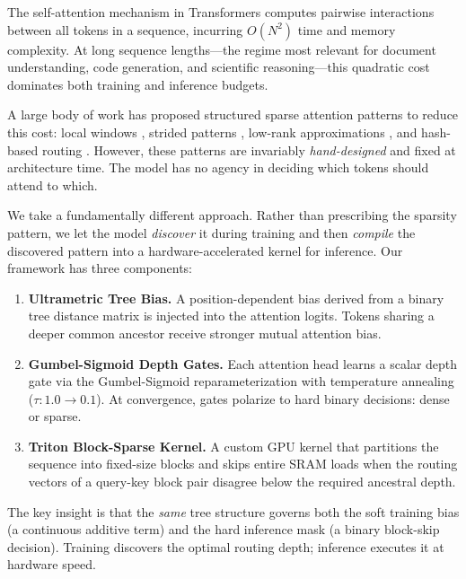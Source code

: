 \documentclass[11pt,a4paper]{article}
\begin{document}
The self-attention mechanism in Transformers computes pairwise interactions between all tokens in a sequence, incurring $O(N^2)$ time and memory complexity. At long sequence lengths---the regime most relevant for document understanding, code generation, and scientific reasoning---this quadratic cost dominates both training and inference budgets.

A large body of work has proposed structured sparse attention patterns to reduce this cost: local windows \citep{beltagy2020longformer}, strided patterns \citep{child2019sparse}, low-rank approximations \citep{wang2020linformer}, and hash-based routing \citep{kitaev2020reformer}. However, these patterns are invariably \emph{hand-designed} and fixed at architecture time. The model has no agency in deciding which tokens should attend to which.

We take a fundamentally different approach. Rather than prescribing the sparsity pattern, we let the model \emph{discover} it during training and then \emph{compile} the discovered pattern into a hardware-accelerated kernel for inference. Our framework has three components:

\begin{enumerate}
    \item \textbf{Ultrametric Tree Bias.} A position-dependent bias derived from a binary tree distance matrix is injected into the attention logits. Tokens sharing a deeper common ancestor receive stronger mutual attention bias.
    \item \textbf{Gumbel-Sigmoid Depth Gates.} Each attention head learns a scalar depth gate via the Gumbel-Sigmoid reparameterization with temperature annealing ($\tau: 1.0 \to 0.1$). At convergence, gates polarize to hard binary decisions: dense or sparse.
    \item \textbf{Triton Block-Sparse Kernel.} A custom GPU kernel that partitions the sequence into fixed-size blocks and skips entire SRAM loads when the routing vectors of a query-key block pair disagree below the required ancestral depth.
\end{enumerate}

The key insight is that the \emph{same} tree structure governs both the soft training bias (a continuous additive term) and the hard inference mask (a binary block-skip decision). Training discovers the optimal routing depth; inference executes it at hardware speed.

\end{document}

